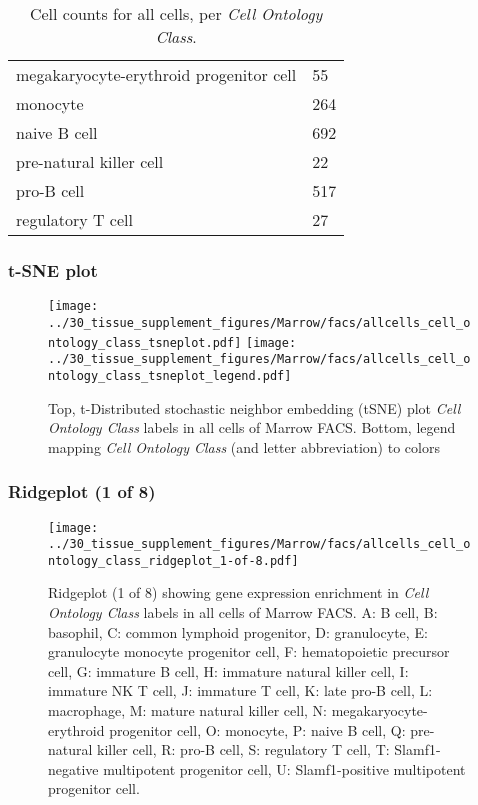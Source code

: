 \begin{table}[h]
\begin{tabular}{@{}ll@{}}
megakaryocyte-erythroid progenitor cell & 55 \\

monocyte & 264 \\

naive B cell & 692 \\

pre-natural killer cell & 22 \\

pro-B cell & 517 \\

regulatory T cell & 27 \\
\bottomrule
\end{tabular}
\caption{Cell counts for all cells, per \emph{Cell Ontology Class}.}
\end{table}

\clearpage
\subsubsection{t-SNE plot}
\begin{figure}[h]
\centering
\texttt{[image: ../30\_tissue\_supplement\_figures/Marrow/facs/allcells\_cell\_ontology\_class\_tsneplot.pdf]}
\texttt{[image: ../30\_tissue\_supplement\_figures/Marrow/facs/allcells\_cell\_ontology\_class\_tsneplot\_legend.pdf]}
\caption{Top, t-Distributed stochastic neighbor embedding (tSNE) plot  \emph{Cell Ontology Class} labels in all cells of Marrow FACS. Bottom, legend mapping \emph{Cell Ontology Class} (and letter abbreviation) to colors}
\end{figure}


\clearpage

\subsubsection{Ridgeplot (1 of 8)}
\begin{figure}[h]
\centering
\texttt{[image: ../30\_tissue\_supplement\_figures/Marrow/facs/allcells\_cell\_ontology\_class\_ridgeplot\_1-of-8.pdf]}

\caption{ Ridgeplot (1 of 8)  showing gene expression enrichment in \emph{Cell Ontology Class} labels in all cells of Marrow FACS. A: B cell, B: basophil, C: common lymphoid progenitor, D: granulocyte, E: granulocyte monocyte progenitor cell, F: hematopoietic precursor cell, G: immature B cell, H: immature natural killer cell, I: immature NK T cell, J: immature T cell, K: late pro-B cell, L: macrophage, M: mature natural killer cell, N: megakaryocyte-erythroid progenitor cell, O: monocyte, P: naive B cell, Q: pre-natural killer cell, R: pro-B cell, S: regulatory T cell, T: Slamf1-negative multipotent progenitor cell, U: Slamf1-positive multipotent progenitor cell.}
\end{figure}


